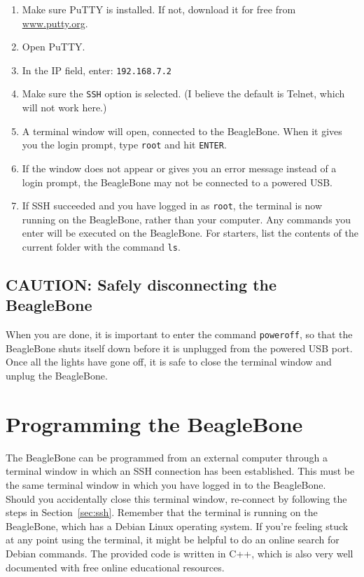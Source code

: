 \documentclass[11pt, letterpaper]{article}
\begin{document}
\begin{enumerate}
	\item Make sure PuTTY is installed. If not, download it for free from \href{wwww.putty.org}{www.putty.org}. 
	\item Open PuTTY.
	\item In the IP field, enter: \texttt{192.168.7.2}
	\item Make sure the \texttt{SSH} option is selected. (I believe the default is Telnet, which will not work here.)
	\item A terminal window will open, connected to the BeagleBone. When it gives you the login prompt, type \texttt{root} and hit \texttt{ENTER}.
	\item If the window does not appear or gives you an error message instead of a login prompt, the BeagleBone may not be connected to a powered USB.
	\item If SSH succeeded and you have logged in as \texttt{root}, the terminal is now running on the BeagleBone, rather than your computer. Any commands you enter will be executed on the BeagleBone. For starters, list the contents of the current folder with the command \texttt{ls}.
\end{enumerate}

\subsection{CAUTION: Safely disconnecting the BeagleBone}

When you are done, it is important to enter the command \texttt{poweroff}, so that the BeagleBone shuts itself down before it is unplugged from the powered USB port. Once all the lights have gone off, it is safe to close the terminal window and unplug the BeagleBone.



\section{Programming the BeagleBone}
\label{sec:prog}
The BeagleBone can be programmed from an external computer through a terminal window in which an SSH connection has been established. This must be the same terminal window in which you have logged in to the BeagleBone. Should you accidentally close this terminal window, re-connect by following the steps in Section~\ref{sec:ssh}. Remember that the terminal is running on the BeagleBone, which has a Debian Linux operating system. If you're feeling stuck at any point using the terminal, it might be helpful to do an online search for Debian commands. The provided code is written in C++, which is also very well documented with free online educational resources.
\end{document}
